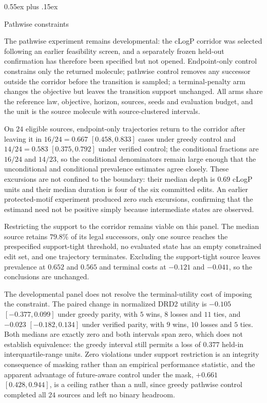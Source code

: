 \documentclass{article}
\makeatletter
\theoremstyle{definition}
\theoremstyle{remark}
\def\subsection{\@startsection{subsection}{2}{\z@}{-1.2ex plus -0.4ex minus -.2ex}%
  {0.55ex plus .15ex}{\normalsize\sc\raggedright}}
\makeatother
\begin{document}
\subsection{Pathwise constraints}
\label{sec:exp-pathwise}
\label{app:exp-pathwise}

The pathwise experiment remains developmental: the cLogP corridor was selected following an earlier feasibility screen, and a separately frozen held-out confirmation has therefore been specified but not opened. Endpoint-only control constrains only the returned molecule; pathwise control removes any successor outside the corridor before the transition is sampled; a terminal-penalty arm changes the objective but leaves the transition support unchanged. All arms share the reference law, objective, horizon, sources, seeds and evaluation budget, and the unit is the source molecule with source-clustered intervals.

On $24$ eligible sources, endpoint-only trajectories return to the corridor after leaving it in $16/24=0.667$ $[0.458,0.833]$ cases under greedy control and $14/24=0.583$ $[0.375,0.792]$ under verified control; the conditional fractions are $16/24$ and $14/23$, so the conditional denominators remain large enough that the unconditional and conditional prevalence estimates agree closely. These excursions are not confined to the boundary: their median depth is $0.69$ cLogP units and their median duration is four of the six committed edits. An earlier protected-motif experiment produced zero such excursions, confirming that the estimand need not be positive simply because intermediate states are observed.

Restricting the support to the corridor remains viable on this panel. The median source retains $79.8\%$ of its legal successors, only one source reaches the prespecified support-tight threshold, no evaluated state has an empty constrained edit set, and one trajectory terminates. Excluding the support-tight source leaves prevalence at $0.652$ and $0.565$ and terminal costs at $-0.121$ and $-0.041$, so the conclusions are unchanged.

The developmental panel does not resolve the terminal-utility cost of imposing the constraint. The paired change in normalized DRD2 utility is $-0.105$ $[-0.377,0.099]$ under greedy parity, with $5$ wins, $8$ losses and $11$ ties, and $-0.023$ $[-0.182,0.134]$ under verified parity, with $9$ wins, $10$ losses and $5$ ties. Both medians are exactly zero and both intervals span zero, which does not establish equivalence: the greedy interval still permits a loss of $0.377$ held-in interquartile-range units. Zero violations under support restriction is an integrity consequence of masking rather than an empirical performance statistic, and the apparent advantage of future-aware control under the mask, $+0.661$ $[0.428,0.944]$, is a ceiling rather than a null, since greedy pathwise control completed all $24$ sources and left no binary headroom.
\end{document}
